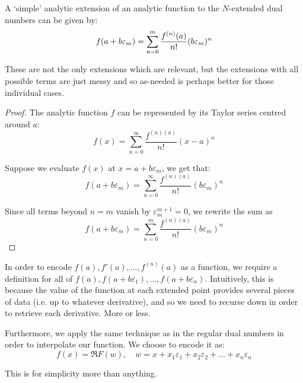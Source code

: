 \begin{theorem}
    A `simple' analytic extension of an analytic function to the $N$-extended dual numbers can be given by:
    $$
        f(a+b\varepsilon_m)=\sum_{n=0}^{m}{\frac{f^{(n)}(a)}{n!}(b\varepsilon_m)^n}
    $$

    These are not the only extensions which are relevant, but the extensions with all possible terms are just messy and so as-needed is perhaps better for those individual cases.
    \begin{proof}
        The analytic function $f$ can be represented by its Taylor series centred around $a$:
        $$
            f(x) = \sum_{n=0}^{\infty}{\frac{f^{(n)(a)}}{n!}(x-a)^n}
        $$

        Suppose we evaluate $f(x)$ at $x=a+b\varepsilon_m$, we get that:
        $$
            f(a+b\varepsilon_m) = \sum_{n=0}^{\infty}{\frac{f^{(n)(a)}}{n!}(b\varepsilon_m)^n}
        $$

        Since all terms beyond $n=m$ vanish by $\varepsilon_m^{m+1}=0$, we rewrite the sum as
        $$
            f(a+b\varepsilon_m) = \sum_{n=0}^{m}{\frac{f^{(n)(a)}}{n!}(b\varepsilon_m)^n}
        $$
    \end{proof}
\end{theorem}

In order to encode $f(a),f'(a),\dots,f^{(n)}(a)$ as a function, we require a definition for all of $f(a),f(a+b\varepsilon_1),\dots,f(a+b\varepsilon_n)$. Intuitively, this is because the value of the function at each extended point provides several pieces of data (i.e. up to whatever derivative), and so we need to recurse down in order to retrieve each derivative. More or less.

Furthermore, we apply the same technique as in the regular dual numbers in order to interpolate our function. We choose to encode it as:
$$
    f(x)=\Re{F(w)},\quad w=x+x_1\varepsilon_1+x_2\varepsilon_2+\dots+x_n\varepsilon_n
$$

This is for simplicity more than anything.

